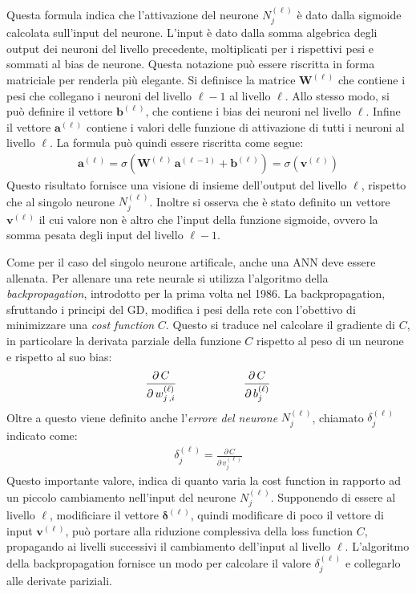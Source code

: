 \noindent Questa formula indica che l'attivazione del neurone $N^{(\ell)}_j$ è dato dalla sigmoide calcolata sull'input del neurone. L'input è dato dalla somma algebrica degli output dei neuroni del livello precedente, moltiplicati per i rispettivi pesi e sommati al bias de neurone. Questa notazione può essere riscritta in forma matriciale per renderla più elegante. Si definisce la matrice $\mathbf{W}^{(\ell)}$ che contiene i pesi che collegano i neuroni del livello $\ell-1$ al livello $\ell$. Allo stesso modo, si può definire il vettore $\mathbf{b}^{(\ell)}$, che contiene i bias dei neuroni nel livello $\ell$. Infine il vettore $\mathbf{a}^{(\ell)}$ contiene i valori delle funzione di attivazione di tutti i neuroni al livello $\ell$. La formula può quindi essere riscritta come segue:
% 
\begin{gather*}
    \mathbf{a}^{(\ell)} = \sigma\left( \mathbf{W}^{(\ell)}\, \mathbf{a}^{(\ell -1)} + \mathbf{b}^{(\ell)}\right) = \sigma\left( \mathbf{v}^{(\ell)}\right)
\end{gather*}
% 
\noindent Questo risultato fornisce una visione di insieme dell'output del livello $\ell$, rispetto che al singolo neurone $N^{(\ell)}_j$. Inoltre si osserva che è stato definito un vettore $\mathbf{v}^{(\ell)}$ il cui valore non è altro che l'input della funzione sigmoide, ovvero la somma pesata degli input del livello $\ell - 1$.

Come per il caso del singolo neurone artificale, anche una \acs{ANN} deve essere allenata. Per allenare una rete neurale si utilizza l'algoritmo della \textit{backpropagation}, introdotto per la prima volta nel 1986. La backpropagation, sfruttando i principi del \acs{GD}, modifica i pesi della rete con l'obettivo di minimizzare una \textsl{cost function} $C$. Questo si traduce nel calcolare il gradiente di $C$, in particolare la derivata parziale della funzione $C$ rispetto al peso di un neurone e rispetto al suo bias:
% 
\begin{gather*}
    \frac{\partial\,C}{\partial\,w^{(\ell)}_{j\,,i}}
    \hspace{60px}
    \frac{\partial\,C}{\partial\,b^{(\ell)}_j}
\end{gather*}
% 
\noindent Oltre a questo viene definito anche l'\textsl{errore del neurone} $N^{(\ell)}_j$, chiamato $\delta^{(\ell)}_j$ indicato come:
% 
\begin{gather*}
    \delta^{(\ell)}_j = \frac{\partial\,C}{\partial\,v^{(\ell)}_j}
\end{gather*}
% 
\noindent Questo importante valore, indica di quanto varia la cost function in rapporto ad un piccolo cambiamento nell'input del neurone $N^{(\ell)}_j$. Supponendo di essere al livello $\ell$, modificiare il vettore $\boldsymbol{\delta}^{(\ell)}$, quindi modificare di poco il vettore di input $\mathbf{v}^{(\ell)}$, può portare alla riduzione complessiva della loss function $C$, propagando ai livelli successivi il cambiamento dell'input al livello $\ell$. L'algoritmo della backpropagation fornisce un modo per calcolare il valore $\delta^{(\ell)}_j$ e collegarlo alle derivate pariziali.


